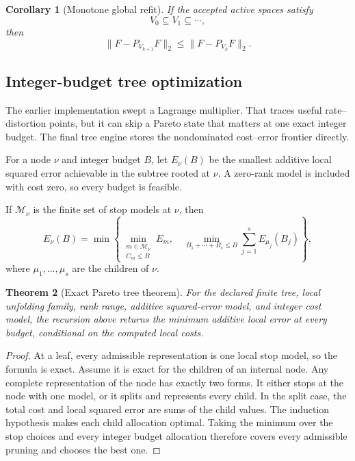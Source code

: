 \documentclass[11pt]{article}
\newtheorem{theorem}{Theorem}[section]
\newtheorem{corollary}[theorem]{Corollary}
\theoremstyle{definition}
\theoremstyle{remark}
\begin{document}
\begin{corollary}[Monotone global refit]
If the accepted active spaces satisfy
\[
V_0\subseteq V_1\subseteq\cdots,
\]
then
\[
\boxed{
\|F-P_{V_{k+1}}F\|_2
\le
\|F-P_{V_k}F\|_2.
}
\]
\end{corollary}

\FloatBarrier
\subsection{Integer-budget tree optimization}
The earlier implementation swept a Lagrange multiplier. That traces useful rate--distortion points, but it can skip a Pareto state that matters at one exact integer budget. The final tree engine stores the nondominated cost--error frontier directly.

For a node $\nu$ and integer budget $B$, let $E_\nu(B)$ be the smallest additive local squared error achievable in the subtree rooted at $\nu$. A zero-rank model is included with cost zero, so every budget is feasible.

If $\mathcal M_\nu$ is the finite set of stop models at $\nu$, then
\[
\boxed{
E_\nu(B)
=
\min\left\{
\min_{\substack{m\in\mathcal M_\nu\\ C_m\le B}}E_m,
\quad
\min_{B_1+\cdots+B_s\le B}
\sum_{j=1}^{s}E_{\mu_j}(B_j)
\right\},
}
\]
where $\mu_1,\ldots,\mu_s$ are the children of $\nu$.

\begin{theorem}[Exact Pareto tree theorem]
For the declared finite tree, local unfolding family, rank range, additive squared-error model, and integer cost model, the recursion above returns the minimum additive local error at every budget, conditional on the computed local costs.
\end{theorem}

\begin{proof}
At a leaf, every admissible representation is one local stop model, so the formula is exact. Assume it is exact for the children of an internal node. Any complete representation of the node has exactly two forms. It either stops at the node with one model, or it splits and represents every child. In the split case, the total cost and local squared error are sums of the child values. The induction hypothesis makes each child allocation optimal. Taking the minimum over the stop choices and every integer budget allocation therefore covers every admissible pruning and chooses the best one.
\end{proof}
\end{document}

